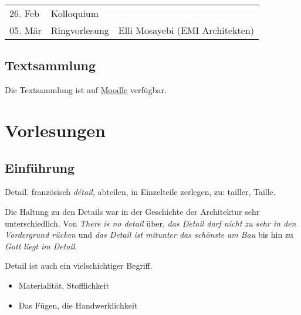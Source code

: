 \documentclass[11pt]{article}
\begin{document}
\begin{center}
\begin{tabular}{lll}
26. Feb & Kolloquium & \\
05. Mär & Ringvorlesung & Elli Mosayebi (EMI Architekten)\\
\end{tabular}
\end{center}


\subsection{Textsammlung}
\label{sec-1-6}

Die Textsammlung ist auf \href{https://moodle-app2.let.ethz.ch/course/view.php?id\%3D4339}{Moodle} verfügbar.

\section{Vorlesungen}
\label{sec-2}

\subsection{Einführung}
\label{sec-2-1}

Detail. französisch \emph{détail}, abteilen, in Einzelteile zerlegen, zu: tailler,
Taille.

Die Haltung zu den Details war in der Geschichte der Architektur sehr
unterschiedlich. Von \emph{There is no detail} über, \emph{das Detail darf nicht zu
sehr in den Vordergrund rücken} und \emph{das Detail ist mitunter das schönste am
Bau} bis hin zu \emph{Gott liegt im Detail}.

Detail ist auch ein vielschichtiger Begriff.

\begin{itemize}
\item Materialität, Stofflichkeit
\item Das Fügen, die Handwerklichkeit
\end{itemize}
\end{document}
